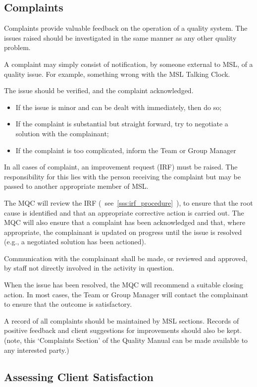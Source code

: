 \subsection{Complaints}
\label{ss:complaints}
Complaints provide valuable feedback on the operation of a quality system. The issues raised should be investigated in the same manner as any other quality problem. 

A complaint may simply consist of notification, by someone external to MSL, of a quality issue. For example, something wrong with the MSL Talking Clock. 

The issue should be verified, and the complaint acknowledged.
\begin{itemize}
\item If the issue is minor and can be dealt with immediately, then do so;
\item If the complaint is substantial but straight forward, try to negotiate a solution with the complainant;
\item If the complaint is too complicated, inform the Team or Group Manager
\end{itemize}

In all cases of complaint, an improvement request (IRF) must be raised. The responsibility for this lies with the person receiving the complaint but may be passed to another appropriate member of MSL.

The MQC will review the IRF (~see~\ref{sss:irf_procedure}~), to ensure that the root cause is identified and that an appropriate corrective action is carried out.  
The MQC will also ensure that a complaint has been acknowledged and that, where appropriate, the complainant is updated on progress until the issue is resolved (e.g., a negotiated solution has been actioned). 

Communication with the complainant shall be made, or reviewed and approved, by staff not directly involved in the activity in question.

When the issue has been resolved, the MQC will recommend a suitable closing action. In most cases, the Team or Group Manager will contact the complainant to ensure that the outcome is satisfactory. 

A record of all complaints should be maintained by MSL sections. Records of positive feedback and client suggestions for improvements should also be kept.
(note, this `Complaints Section' of the Quality Manual can be made available to any interested party.)

\subsection{Assessing Client Satisfaction}
\label{ss:client_satisfaction}
